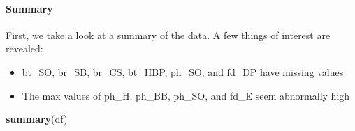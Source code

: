 \documentclass[]{article}
\newenvironment{Shaded}{\begin{snugshade}}{\end{snugshade}}
\newcommand{\KeywordTok}[1]{\textcolor[rgb]{0.13,0.29,0.53}{\textbf{#1}}}
\newcommand{\NormalTok}[1]{#1}
\providecommand{\tightlist}{%
  \setlength{\itemsep}{0pt}\setlength{\parskip}{0pt}}
\let\oldparagraph\paragraph
\renewcommand{\paragraph}[1]{\oldparagraph{#1}\mbox{}}
\begin{document}
\hypertarget{summary}{%
\paragraph{Summary}\label{summary}}

First, we take a look at a summary of the data. A few things of interest
are revealed:

\begin{itemize}
\tightlist
\item
  bt\_SO, br\_SB, br\_CS, bt\_HBP, ph\_SO, and fd\_DP have missing
  values
\item
  The max values of ph\_H, ph\_BB, ph\_SO, and fd\_E seem abnormally
  high
\end{itemize}

\begin{Shaded}
\begin{Highlighting}[]
\KeywordTok{summary}\NormalTok{(df)}
\end{Highlighting}
\end{Shaded}
\end{document}
